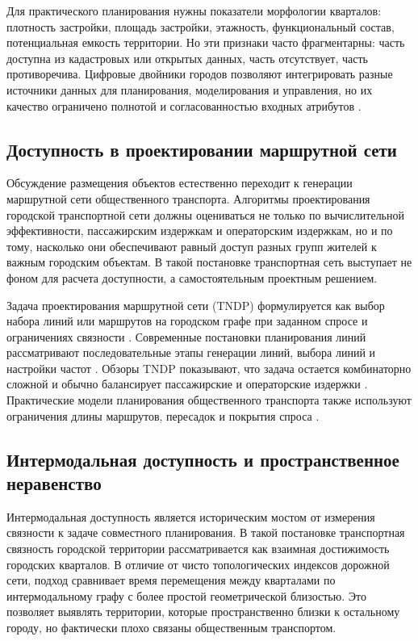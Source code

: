 \documentclass[14pt,a4paper]{extarticle}
\begin{document}
Для практического планирования нужны показатели морфологии кварталов: плотность застройки, площадь застройки, этажность, функциональный состав, потенциальная емкость территории. Но эти признаки часто фрагментарны: часть доступна из кадастровых или открытых данных, часть отсутствует, часть противоречива. Цифровые двойники городов позволяют интегрировать разные источники данных для планирования, моделирования и управления, но их качество ограничено полнотой и согласованностью входных атрибутов \cite{batty2018digitalTwin}.

\subsection*{Доступность в проектировании маршрутной сети}

Обсуждение размещения объектов естественно переходит к генерации маршрутной сети общественного транспорта. Алгоритмы проектирования городской транспортной сети должны оцениваться не только по вычислительной эффективности, пассажирским издержкам и операторским издержкам, но и по тому, насколько они обеспечивают равный доступ разных групп жителей к важным городским объектам. В такой постановке транспортная сеть выступает не фоном для расчета доступности, а самостоятельным проектным решением.

Задача проектирования маршрутной сети (TNDP) формулируется как выбор набора линий или маршрутов на городском графе при заданном спросе и ограничениях связности \cite{mandl1980tndp}. Современные постановки планирования линий рассматривают последовательные этапы генерации линий, выбора линий и настройки частот \cite{schmidt2024linePlanning}. Обзоры TNDP показывают, что задача остается комбинаторно сложной и обычно балансирует пассажирские и операторские издержки \cite{duranMicco2022tndpReview}. Практические модели планирования общественного транспорта также используют ограничения длины маршрутов, пересадок и покрытия спроса \cite{sahin2023linePlanning}.

\subsection*{Интермодальная доступность и пространственное неравенство}

Интермодальная доступность является историческим мостом от измерения связности к задаче совместного планирования. В такой постановке транспортная связность городской территории рассматривается как взаимная достижимость городских кварталов. В отличие от чисто топологических индексов дорожной сети, подход сравнивает время перемещения между кварталами по интермодальному графу с более простой геометрической близостью. Это позволяет выявлять территории, которые пространственно близки к остальному городу, но фактически плохо связаны общественным транспортом.
\end{document}
